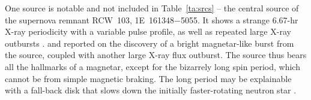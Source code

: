 One source is notable and not included in Table~\ref{ta:srcs} --
the central source of the supernova remnant RCW~103, 1E~161348$-$5055.  It
shows a strange 6.67-hr X-ray periodicity with a variable pulse profile, as well as repeated large X-ray outbursts
\citep{dcm+06b}.  \citet{aeb+16} and \citet{rbe+16} reported on the discovery of a bright magnetar-like burst from the
source, coupled with another large X-ray flux outburst.  The source thus bears all the hallmarks of a magnetar,
except for the bizarrely long spin period, which cannot be from simple magnetic braking.  
The long period may be explainable with a fall-back disk 
that slows down the initially faster-rotating neutron star 
\citep{li07,ha17}.  



